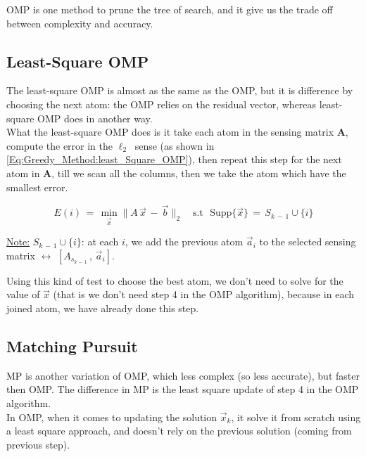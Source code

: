 \documentclass[12pt,a4paper]{book}
\begin{document}
OMP is one method to prune the tree of search, and it give us the trade off between complexity and accuracy.\\

\subsection{Least-Square OMP}

The least-square OMP is almost as the same as the OMP, but it is difference by choosing the next atom: the OMP relies on the residual vector, whereas least-square OMP does in another way.\\

What the least-square OMP does is it take each atom in the sensing matrix $\boldsymbol{A}$, compute the error in the $\ell_2 ~$ sense (as shown in \autoref{Eq:Greedy_Method:least_Square_OMP}), then repeat this step for the next atom in $\boldsymbol{A}$, till we scan all the columns, then we take the atom which have the smallest error.


\begin{equation}
         E(i) \, = \, \min_{\Vec{x}} \lVert A \, \Vec{x} \, - \, \Vec{b} \rVert_2 \quad \text{s.t } \text{ Supp} \{\Vec{x}\} \, = \,  S_{k \, - \, 1} \cup \{ i \}
\label{Eq:Greedy_Method:least_Square_OMP}
     \end{equation}

\underline{Note:} $S_{k \, - \, 1} \cup \{ i \}$: at each $i$, we add the previous atom $\Vec{a}_i$ to the selected sensing matrix $ \leftrightarrow \, \,[A_{s_{k \, - \,1}} \, , \, \Vec{a}_i]$.

Using this kind of test to choose the best atom, we don't need to solve for the value of $\Vec{x}$ (that is we don't need step 4 in the OMP algorithm), because in each joined atom, we have already done this step.\\

\subsection{Matching Pursuit}

MP is another variation of OMP, which less complex (so less accurate), but faster then OMP. The difference in MP is the least square update of step 4 in the OMP algorithm.\\

In OMP, when it comes to updating the solution $\Vec{x}_k$, it solve it from scratch using a least square approach, and doesn't rely on the previous solution (coming from previous step).\\
\end{document}
